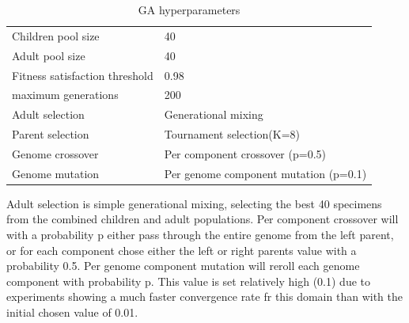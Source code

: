 \begin{table}
  \centering
  \caption{GA hyperparameters}
  \label{table:ga-hyperparameters}
  \begin{tabular}{ll}
    Children pool size             & 40                                    \\
    Adult pool size                & 40                                    \\
    Fitness satisfaction threshold & 0.98                                  \\
    maximum generations            & 200                                   \\
    Adult selection                & Generational mixing                   \\
    Parent selection               & Tournament selection(K=8)             \\
    Genome crossover               & Per component crossover (p=0.5)       \\
    Genome mutation                & Per genome component mutation (p=0.1) \\
  \end{tabular}
\end{table}

Adult selection is simple generational mixing,
selecting the best 40 specimens from the combined children and adult populations.
Per component crossover will with a probability p either pass through the entire genome from the left parent,
or for each component chose either the left or right parents value with a probability 0.5.
Per genome component mutation will reroll each genome component with probability p.
This value is set relatively high (0.1) due to experiments showing a much faster convergence rate fr this domain than with the initial chosen value of 0.01.
